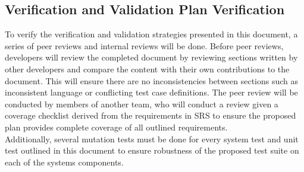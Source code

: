\documentclass[12pt, titlepage]{article}
\begin{document}
\subsection{Verification and Validation Plan Verification}

To verify the verification and validation strategies presented in this document, a series of peer reviews and internal reviews will be done. Before peer reviews, developers will review the completed document by reviewing sections written by other developers and compare the content with their own contributions to the document. This will ensure there are no inconsistencies between sections such as inconsistent language or conflicting test case definitions. The peer review will be conducted by members of another team, who will conduct a review given a coverage checklist derived from the requirements in SRS to ensure the proposed plan provides complete coverage of all outlined requirements.
\\
Additionally, several mutation tests must be done for every system test and unit test outlined in this document to ensure robustness of the proposed test suite on each of the systems components.
\end{document}
